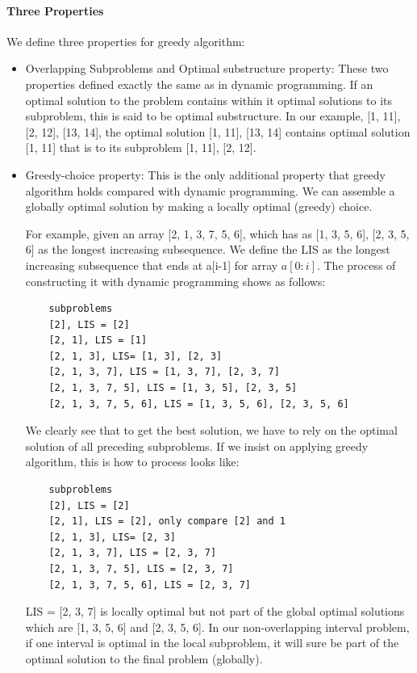 \documentclass[../main.tex]{subfiles}
\begin{document}
\paragraph{Three Properties} We define three properties for greedy algorithm:
\begin{itemize}
    \item Overlapping Subproblems and Optimal substructure property: These two properties defined exactly the same as in dynamic programming. If an optimal solution to the problem contains within it optimal solutions to its subproblem, this is said to be optimal substructure. In our example, [1, 11], [2, 12], [13, 14], the optimal solution [1, 11], [13, 14] contains optimal solution [1, 11] that is to its subproblem [1, 11], [2, 12]. 
    \item Greedy-choice property: This is the only additional property that greedy algorithm holds compared with dynamic programming. We can assemble a globally optimal solution by making a locally optimal (greedy) choice. 
    
    For example, given an array [2, 1, 3, 7, 5, 6], which has as [1, 3, 5, 6], [2, 3, 5, 6] as the longest increasing subsequence. We define the LIS as the longest increasing subsequence that ends at a[i-1] for array $a[0:i]$. The process of constructing it with dynamic programming shows as follows:
    \begin{lstlisting}
    subproblems
    [2], LIS = [2]
    [2, 1], LIS = [1]
    [2, 1, 3], LIS= [1, 3], [2, 3]
    [2, 1, 3, 7], LIS = [1, 3, 7], [2, 3, 7]
    [2, 1, 3, 7, 5], LIS = [1, 3, 5], [2, 3, 5]
    [2, 1, 3, 7, 5, 6], LIS = [1, 3, 5, 6], [2, 3, 5, 6]
    \end{lstlisting}
    We clearly see that to get the best solution, we have to rely on the optimal solution of all preceding subproblems. If we insist on applying greedy algorithm, this is how to process looks like:
      \begin{lstlisting}
    subproblems
    [2], LIS = [2]
    [2, 1], LIS = [2], only compare [2] and 1
    [2, 1, 3], LIS= [2, 3]
    [2, 1, 3, 7], LIS = [2, 3, 7]
    [2, 1, 3, 7, 5], LIS = [2, 3, 7]
    [2, 1, 3, 7, 5, 6], LIS = [2, 3, 7]
    \end{lstlisting}
    LIS = [2, 3, 7] is locally optimal but not part of the global optimal solutions which are [1, 3, 5, 6] and [2, 3, 5, 6]. In our non-overlapping interval problem, if one interval is optimal in the local subproblem, it will sure be part of the optimal solution to the final problem (globally). 
    
    
 
\end{itemize}
\end{document}
